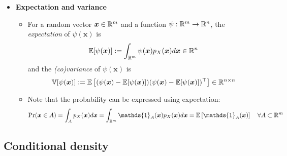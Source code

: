 \documentclass[12pt,a4paper]{article}
\begin{document}
\begin{itemize}
\item \textbf{Expectation and variance}
  \begin{itemize}
  \item For a random vector $\bm{x}\in \mathbb{R}^{m}$
    and a function $\psi:\mathbb{R}^{m}\to\mathbb{R}^{n}$,
    the \emph{expectation} of $\psi(\bm{x})$ is
    \begin{equation}\nonumber%
      \mathbb{E}[\psi(\bm{x})] := \int_{\R^{m}}\psi(\bm{x})p_{X}(\bm{x})d\bm{x} \in \R^{n}
    \end{equation}
    and the \emph{(co)variance} of $\psi(\bm{x})$ is
    \begin{equation}\nonumber%
      \mathbb{V}[\psi(\bm{x})] := \mathbb{E}\left[(\psi(\bm{x}) - \mathbb{E}[\psi(\bm{x})])(\psi(\bm{x}) - \mathbb{E}[\psi(\bm{x})])^{\top}\right] \in \R^{n\times n}
    \end{equation}
  \item Note that the probability can be expressed using expectation:
    \begin{equation}\nonumber%
      \text{Pr}(\bm{x}\in A)
      = \int_{A}p_{X}(\bm{x})d\bm{x}
      = \int_{\R^{m}}\mathds{1}_{A}(\bm{x})p_{X}(\bm{x})d\bm{x}
      = \mathbb{E}\left[\mathds{1}_{A}(\bm{x})\right]
      \quad \forall A\subset \R^{m}
    \end{equation}

  \end{itemize}

\end{itemize}

\subsection{Conditional density}
\end{document}
